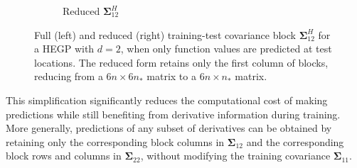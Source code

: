 \documentclass[12pt]{article}
\begin{document}
\begin{figure}[h!]
\begin{subfigure}[t]{0.30\textwidth}
		\caption{Reduced $\boldsymbol{\Sigma}^{H}_{12}$}
	\end{subfigure}
	\caption{Full (left) and reduced (right) training-test covariance block $\boldsymbol{\Sigma}^{H}_{12}$ for a HEGP with $d=2$, when only function values are predicted at test locations. The reduced form retains only the first column of blocks, reducing from a $6n \times 6n_*$ matrix to a $6n \times n_*$ matrix.}
	\label{fig:hegp_s12_reduction}
\end{figure}
This simplification significantly reduces the computational cost of making predictions while still benefiting from derivative information during training. More generally, predictions of any subset of derivatives can be obtained by retaining only the corresponding block columns in $\boldsymbol{\Sigma}_{12}$ and the corresponding block rows and columns in $\boldsymbol{\Sigma}_{22}$, without modifying the training covariance $\boldsymbol{\Sigma}_{11}$.
\end{document}
